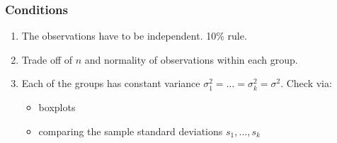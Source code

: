 \documentclass[handout]{beamer}
\newcommand{\blue}[1]{\textcolor{blue2}{#1}}
\begin{document}
\begin{frame}
\frametitle{Conditions}

\begin{enumerate}
\item The observations have to be \blue{independent}.  10\% rule.  
\pause \item Trade off of $n$ and \blue{normality} of observations \blue{within each group}. 
\pause \item Each of the groups has \blue{constant variance} $\sigma_1^2 = \ldots = \sigma_k^2 = \sigma^2$.  Check via:
\begin{itemize}
\item boxplots
\item comparing the sample standard deviations $s_1, \ldots, s_k$
\end{itemize}
\end{enumerate}

\end{frame}
\end{document}
